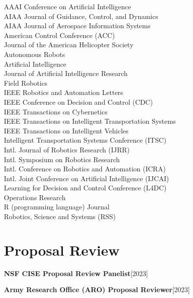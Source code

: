 \documentclass[10pt,roman]{moderncv}
\newcommand{\mycvitem}[2]{
    \textbf{#2}\hfill [#1]\break
}
\begin{document}
\vspace{-2ex}
\begin{multicols}{2}
\small
AAAI Conference on Artificial Intelligence\\
AIAA Journal of Guidance, Control, and Dynamics\\
AIAA Journal of Aerospace Information Systems\\
American Control Conference (ACC)\\
Journal of the American Helicopter Society\\
Autonomous Robots\\
Artificial Intelligence\\
Journal of Artificial Intelligence Research\\
Field Robotics\\
IEEE Robotics and Automation Letters\\
IEEE Conference on Decision and Control (CDC)\\
IEEE Transactions on Cybernetics\\
IEEE Transactions on Intelligent Transportation Systems\\
IEEE Transactions on Intelligent Vehicles\\
Intelligent Transportation Systems Conference (ITSC)\\
Intl. Journal of Robotics Research (IJRR)\\
Intl. Symposium on Robotics Research\\
Intl. Conference on Robotics and Automation (ICRA)\\
Intl. Joint Conference on Artificial Intelligence (IJCAI)\\
Learning for Decision and Control Conference (L4DC)\\
Operations Research\\
R (programming language) Journal\\
Robotics, Science and Systems (RSS)\\
\end{multicols}

\section{Proposal Review}
\mycvitem{2023}{NSF CISE Proposal Review Panelist}
\mycvitem{2023}{Army Research Office (ARO) Proposal Reviewer}
\end{document}

